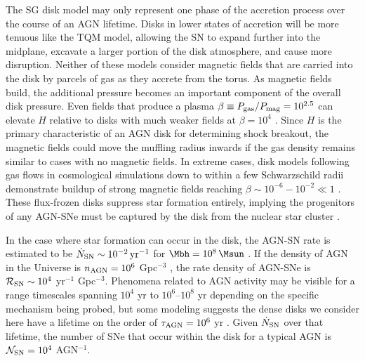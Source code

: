 The SG disk model may only represent one phase of the accretion process over the course of an AGN lifetime.
Disks in lower states of accretion will be more tenuous like the TQM model, allowing the SN to expand further into the midplane, excavate a larger portion of the disk atmosphere, and cause more disruption.
Neither of these models consider magnetic fields that are carried into the disk by parcels of gas as they accrete from the torus.
As magnetic fields build, the additional pressure becomes an important component of the overall disk pressure.
Even fields that produce a plasma $\beta \equiv P_{\rm gas} / P_{\rm mag} = 10^{2.5}$ can elevate $H$ relative to disks with much weaker fields at $\beta=10^4$ \citep{Gerling-Dunsmore+25}.
Since $H$ is the primary characteristic of an AGN disk for determining shock breakout, the magnetic fields could move the muffling radius inwards if the gas density remains similar to cases with no magnetic fields.
In extreme cases, disk models following gas flows in cosmological simulations down to within a few Schwarzschild radii demonstrate buildup of strong magnetic fields reaching $\beta \sim 10^{-6} - 10^{-2} \ll 1$ \citep{Hopkins+25}.
These flux-frozen disks suppress star formation entirely, implying the progenitors of any AGN-SNe must be captured by the disk from the nuclear star cluster \citep{Fabj+20,Nasim+22}.

In the case where star formation can occur in the disk, the AGN-SN rate is estimated to be $\dot{N}_{\rm SN}\sim10^{-2}\,{\rm yr}^{-1}$ for $\Mbh=10^8\,\Msun$ \citep{HuangLinShields23}.
If the density of AGN in the Universe is $n_{\rm AGN}=10^6$ Gpc$^{-3}$ \citep{OsterbrockFerland06}, the rate density of AGN-SNe is $\mathcal{R_{\rm SN}} \sim 10^4$ yr$^{-1}$ Gpc$^{-3}$.
Phenomena related to AGN activity may be visible for a range timescales spanning $10^4$ yr \citep{Morganti17} to $10^6$--$10^8$ yr \citep{Biava+21} depending on the specific mechanism being probed, but some modeling suggests the dense disks we consider here have a lifetime on the order of $\tau_{\rm AGN}=10^6$ yr \citep{Angles-Alcazar+21}.
Given $\dot{N}_{\rm SN}$ over that lifetime, the number of SNe that occur within the disk for a typical AGN is $\mathcal{N}_{\rm SN}=10^4$ AGN$^{-1}$.

